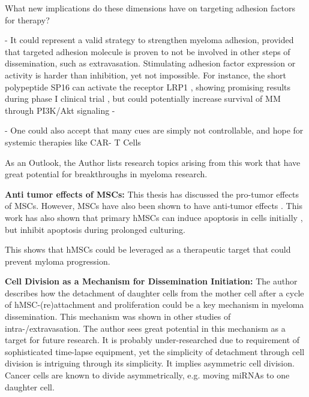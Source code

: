 What new implications do these dimensions have on targeting adhesion factors for
therapy?


- It could represent a valid strategy to
strengthen myeloma adhesion, provided that targeted adhesion molecule is proven
to not be involved in other steps of dissemination, such as extravasation.
Stimulating adhesion factor expression or activity is harder than inhibition,
yet not impossible. For instance, the short polypeptide SP16 can activate the
receptor LRP1 , showing promising results during phase I
clinical trial \cite{wohlfordPhaseClinicalTrial2021}, but could potentially
increase survival of MM through PI3K/Akt signaling
\cite{potereDevelopingLRP1Agonists2019, heinemannInhibitingPI3KAKT2022} -

- One could also accept that many cues are simply not controllable, and hope for
systemic therapies like CAR- T Cells









\label{sec:discussion_potential_breakthroughs}
As an Outlook, the Author lists research topics arising from this work that have
great potential for breakthroughs in myeloma research.

\textbf{Anti tumor effects of MSCs:}
This thesis has discussed the pro-tumor effects of MSCs. However, MSCs have also
been shown to have anti-tumor effects \cite{galderisiMyelomaCellsCan2015}. This
work has also shown that primary \acp{hMSC} can induce apoptosis in  cells
initially ,
but inhibit apoptosis during prolonged culturing.

This shows that hMSCs could be leveraged
as a therapeutic target that could prevent myloma progression.




\textbf{Cell Division as a Mechanism for Dissemination Initiation:}
The author describes how the detachment of daughter cells from the mother cell
after a cycle of hMSC-(re)attachment and proliferation could be a key mechanism
in myeloma dissemination. This mechanism was shown in other studies of
intra-/extravasation. The author sees great potential in this mechanism as a
target for future research. It is probably under-researched due to requirement
of sophisticated time-lapse equipment, yet the simplicity of detachment through
cell division is intriguing through its simplicity. It implies asymmetric cell
division. Cancer cells are known to divide asymmetrically, e.g. moving miRNAs to
one daughter cell.

